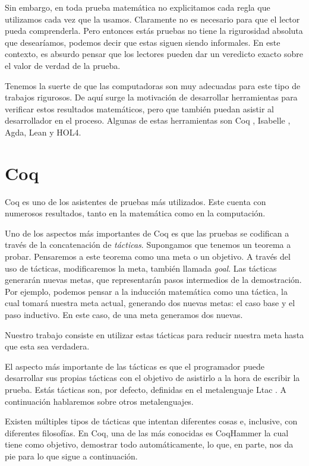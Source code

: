 Sin embargo, en toda prueba matemática no explicitamos cada regla que utilizamos cada vez que la usamos.
Claramente no es necesario para que el lector pueda comprenderla.
Pero entonces estás pruebas no tiene la rigurosidad absoluta que desearíamos, podemos decir que estas siguen siendo informales.
En este contexto, es absurdo pensar que los lectores pueden dar un veredicto exacto sobre el valor de verdad de la prueba.

Tenemos la suerte de que las computadoras son muy adecuadas para este tipo de trabajos rigurosos. De aquí surge la motivación de desarrollar herramientas para verificar estos resultados matemáticos, pero que también puedan asistir al desarrollador en el proceso. Algunas de estas herramientas son Coq \cite{CIC}, Isabelle \cite{DBLP:books/sp/NipkowPW02}, Agda, Lean y HOL4.

\section{Coq}

Coq es uno de los asistentes de pruebas más utilizados.
Este cuenta con numerosos resultados, tanto en la matemática como en la computación.

Uno de los aspectos más importantes de Coq es que las pruebas se codifican a través de la concatenación de \emph{tácticas}.
Supongamos que tenemos un teorema a probar.
Pensaremos a este teorema como una meta o un objetivo.
A través del uso de tácticas, modificaremos la meta, también llamada \emph{goal}.
Las tácticas generarán nuevas metas, que representarán pasos intermedios de la demostración.
Por ejemplo, podemos pensar a la inducción matemática como una táctica, la cual tomará nuestra meta actual, generando dos nuevas metas: el caso base y el paso inductivo. En este caso, de una meta generamos dos nuevas.

Nuestro trabajo consiste en utilizar estas tácticas para reducir nuestra meta hasta que esta sea verdadera.

El aspecto más importante de las tácticas es que el programador puede desarrollar sus propias tácticas con el objetivo de asistirlo a la hora de escribir la prueba.
Estás tácticas son, por defecto, definidas en el metalenguaje Ltac \cite{DBLP:conf/lpar/Delahaye00}. A continuación hablaremos sobre otros metalenguajes.

Existen múltiples tipos de tácticas que intentan diferentes cosas e, inclusive, con diferentes filosofías.
En Coq, una de las más conocidas es CoqHammer \cite{DBLP:journals/jar/CzajkaK18} la cual tiene como objetivo, demostrar todo automáticamente, lo que, en parte, nos da pie para lo que sigue a continuación.

